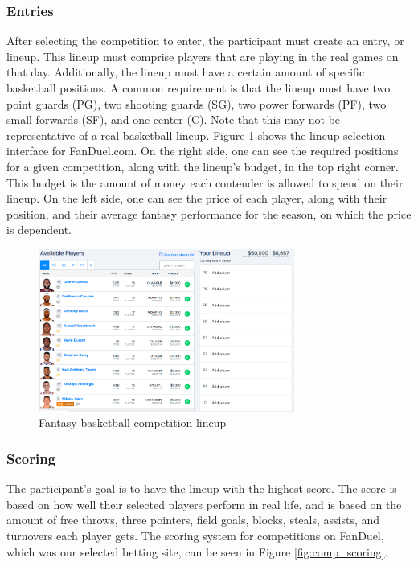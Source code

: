 \subsubsection{Entries}
After selecting the competition to enter, the participant must create an entry, or lineup. This lineup must comprise players that are playing in the real games on that day. Additionally, the lineup must have a certain amount of specific basketball positions. A common requirement is that the lineup must have two point guards (PG), two shooting guards (SG), two power forwards (PF), two small forwards (SF), and one center (C). Note that this may not be representative of a real basketball lineup. Figure \ref{fig:comp_lineup} shows the lineup selection interface for FanDuel.com. On the right side, one can see the required positions for a given competition, along with the lineup's budget, in the top right corner. This budget is the amount of money each contender is allowed to spend on their lineup. On the left side, one can see the price of each player, along with their position, and their average fantasy performance for the season, on which the price is dependent.

\begin{figure}[ht]
    \centering
    \includegraphics[width=0.75\textwidth]{figures/fantasy_competition_lineup}
    \caption{Fantasy basketball competition lineup}
    \label{fig:comp_lineup}
\end{figure}

\subsubsection{Scoring}
The participant's goal is to have the lineup with the highest score. The score is based on how well their selected players perform in real life, and is based on the amount of free throws, three pointers, field goals, blocks, steals, assists, and turnovers each player gets. The scoring system for competitions on FanDuel, which was our selected betting site, can be seen in Figure \ref{fig:comp_scoring}.

